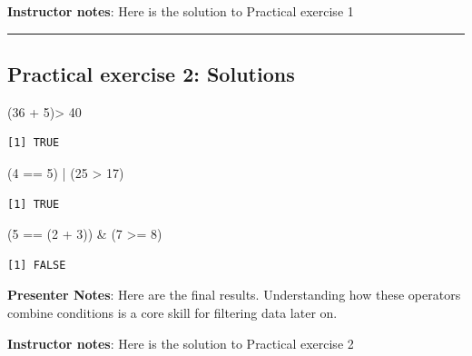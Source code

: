 \documentclass[
  letterpaper,
  DIV=11,
  numbers=noendperiod]{scrartcl}
\newenvironment{Shaded}{\begin{snugshade}}{\end{snugshade}}
\newcommand{\DecValTok}[1]{\textcolor[rgb]{0.68,0.00,0.00}{#1}}
\newcommand{\NormalTok}[1]{\textcolor[rgb]{0.00,0.23,0.31}{#1}}
\newcommand{\SpecialCharTok}[1]{\textcolor[rgb]{0.37,0.37,0.37}{#1}}
\begin{document}
\textbf{Instructor notes}: Here is the solution to Practical exercise 1

\begin{center}\rule{0.5\linewidth}{0.5pt}\end{center}

\subsection{Practical exercise 2:
Solutions}\label{practical-exercise-2-solutions}

\begin{Shaded}
\begin{Highlighting}[]
\NormalTok{(}\DecValTok{36} \SpecialCharTok{+} \DecValTok{5}\NormalTok{)}\SpecialCharTok{\textgreater{}} \DecValTok{40}
\end{Highlighting}
\end{Shaded}

\begin{verbatim}
[1] TRUE
\end{verbatim}

\begin{Shaded}
\begin{Highlighting}[]
\NormalTok{(}\DecValTok{4} \SpecialCharTok{==} \DecValTok{5}\NormalTok{) }\SpecialCharTok{|}\NormalTok{ (}\DecValTok{25} \SpecialCharTok{\textgreater{}} \DecValTok{17}\NormalTok{)}
\end{Highlighting}
\end{Shaded}

\begin{verbatim}
[1] TRUE
\end{verbatim}

\begin{Shaded}
\begin{Highlighting}[]
\NormalTok{(}\DecValTok{5} \SpecialCharTok{==}\NormalTok{ (}\DecValTok{2} \SpecialCharTok{+} \DecValTok{3}\NormalTok{)) }\SpecialCharTok{\&}\NormalTok{ (}\DecValTok{7} \SpecialCharTok{\textgreater{}=} \DecValTok{8}\NormalTok{)}
\end{Highlighting}
\end{Shaded}

\begin{verbatim}
[1] FALSE
\end{verbatim}

\textbf{Presenter Notes}: Here are the final results. Understanding how
these operators combine conditions is a core skill for filtering data
later on.

\textbf{Instructor notes}: Here is the solution to Practical exercise 2
\end{document}
